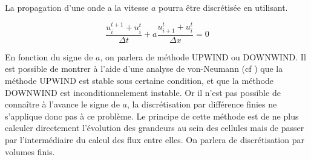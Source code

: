La propagation d'une onde a la vitesse $a$ pourra être discrétisée en utilisant.

\begin{equation}
\frac{u_i^{t+1} + u_i^t }{\Delta t}   +a \frac{u_{i+1}^t  + u_i^t}{\Delta x} = 0
\end{equation}

En fonction du signe de $a$, on parlera de méthode UPWIND ou DOWNWIND.
Il est possible de montrer à l'aide d'une analyse de von-Neumann (cf \cite{toro1999riemann}) que la méthode UPWIND est stable sous certaine condition, et que la méthode DOWNWIND est inconditionnelement instable.
Or il n'est pas possible de connaître à l'avance le signe de $a$, la discrétisation par différence finies ne s'applique donc pas à ce problème. 
Le principe de cette méthode est de ne plus calculer directement l'évolution des grandeurs au sein des cellules mais de passer par l'intermédiaire du calcul des flux entre elles.
On parlera de discrétisation par volumes finis.



